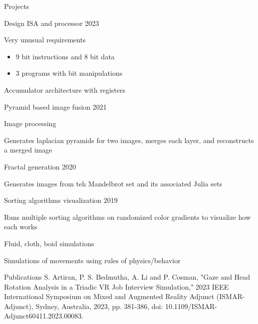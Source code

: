 \begin{rSection}{Projects}
\begin{multicols}{2}
			\begin{rSubsection}{Design ISA and processor} {} {2023}
				\item Very unusual requirements
				\begin{itemize}
					\item 9 bit instructions and 8 bit data
					\item 3 programs with bit manipulations
				\end{itemize}
				\item Accumulator architecture with registers
			\end{rSubsection}

			\begin{rSubsection}{Pyramid based image fusion} {} {2021}
				\item Image processing
				\item Generates laplacian pyramids for two images, merges each layer, and reconstructs a merged image
			\end{rSubsection}

			\begin{rSubsection}{Fractal generation} {} {2020}
				\item Generates images from teh Mandelbrot set and its associated Julia sets
			\end{rSubsection}

			\begin{rSubsection}{Sorting algorithms visualization} {} {2019}
				\item Runs multiple sorting algorithms on randomized color gradients to visualize how each works
			\end{rSubsection}

			\begin{rSubsection}{Fluid, cloth, boid simulations} {} {}
				\item Simulations of movements using rules of physics/behavior
			\end{rSubsection}
			
		\end{multicols}
	\end{rSection}

	\begin{rSection}{Publications}
		S. Artiran, P. S. Bedmutha, A. Li and P. Cosman, "Gaze and Head Rotation Analysis in a Triadic VR Job Interview Simulation," 2023 IEEE International Symposium on Mixed and Augmented Reality Adjunct (ISMAR-Adjunct), Sydney, Australia, 2023, pp. 381-386, doi: 10.1109/ISMAR-Adjunct60411.2023.00083.
	\end{rSection}

